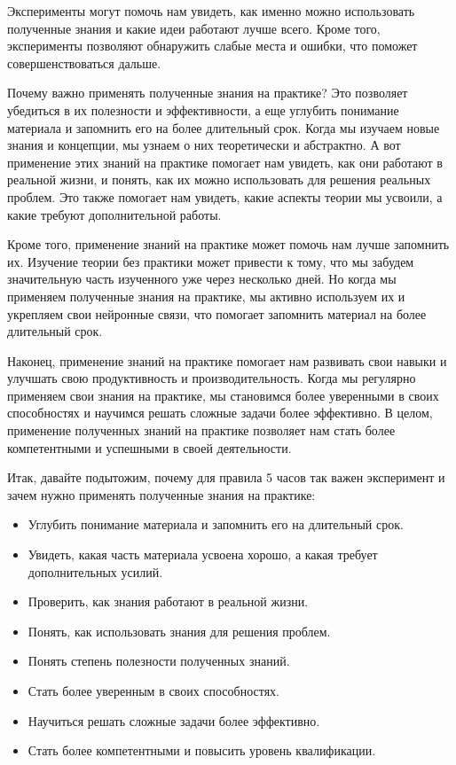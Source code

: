 Эксперименты могут помочь нам увидеть, как именно можно использовать полученные знания и какие идеи работают лучше всего. Кроме того, эксперименты позволяют обнаружить слабые места и ошибки, что поможет совершенствоваться дальше.

Почему важно применять полученные знания на практике? Это позволяет убедиться в их полезности и эффективности, а еще углубить понимание материала и запомнить его на более длительный срок. Когда мы изучаем новые знания и концепции, мы узнаем о них теоретически и абстрактно. А вот применение этих знаний на практике помогает нам увидеть, как они работают в реальной жизни, и понять, как их можно использовать для решения реальных проблем. Это также помогает нам увидеть, какие аспекты теории мы усвоили, а какие требуют дополнительной работы.

Кроме того, применение знаний на практике может помочь нам лучше запомнить их. Изучение теории без практики может привести к тому, что мы забудем значительную часть изученного уже через несколько дней. Но когда мы применяем полученные знания на практике, мы активно используем их и укрепляем свои нейронные связи, что помогает запомнить материал на более длительный срок.

Наконец, применение знаний на практике помогает нам развивать свои навыки и улучшать свою продуктивность и производительность. Когда мы регулярно применяем свои знания на практике, мы становимся более уверенными в своих способностях и научимся решать сложные задачи более эффективно. В целом, применение полученных знаний на практике позволяет нам стать более компетентными и успешными в своей деятельности.

Итак, давайте подытожим, почему для правила 5 часов так важен эксперимент и зачем нужно применять полученные знания на практике:
\begin{itemize}[noitemsep, label=--]
    \item Углубить понимание материала и запомнить его на длительный срок.
    \item Увидеть, какая часть материала усвоена хорошо, а какая требует дополнительных усилий.
    \item Проверить, как знания работают в реальной жизни.
    \item Понять, как использовать знания для решения проблем.
    \item Понять степень полезности полученных знаний.
    \item Стать более уверенным в своих способностях.
    \item Научиться решать сложные задачи более эффективно.
    \item Стать более компетентными и повысить уровень квалификации.
\end{itemize}

